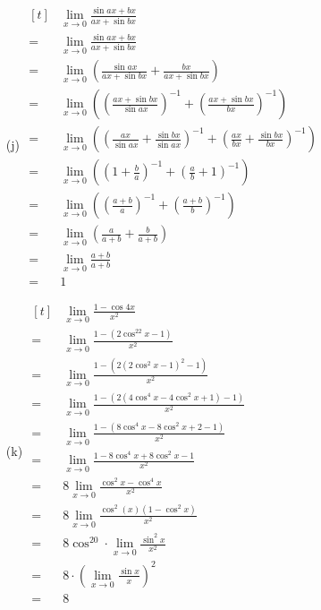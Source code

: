 \documentclass{article}
\begin{document}
\begin{multicols}{2}
\begin{itemize}
\item[(j)] 
$\begin{aligned}[t]
	&\lim\limits_{x\to0}\frac{\sin ax+bx}{ax+\sin bx} \\
	=&\lim\limits_{x\to0}\frac{\sin ax+bx}{ax+\sin bx} \\
	=&\lim\limits_{x\to0}\left(\frac{\sin ax}{ax+\sin bx}+\frac{bx}{ax+\sin bx}\right) \\
	=&\lim\limits_{x\to0}\left(\left(\frac{ax+\sin bx}{\sin ax}\right)^{-1}+
			\left(\frac{ax+\sin bx}{bx}\right)^{-1}\right)\\
	=&\lim\limits_{x\to0}\left(\left(\frac{ax}{\sin ax}+\frac{\sin bx}{\sin ax}\right)^{-1}+
			\left(\frac{ax}{bx}+\frac{\sin bx}{bx}\right)^{-1}\right)\\
			=&\lim\limits_{x\to0}\left(\left(1+\frac{b}{a}\right)^{-1}+\left(\frac{a}{b}+1\right)^{-1}\right)\\
			=&\lim\limits_{x\to0}\left(\left(\frac{a+b}{a}\right)^{-1}+\left(\frac{a+b}{b}\right)^{-1}\right)\\
			=&\lim\limits_{x\to0}\left(\frac{a}{a+b}+\frac{b}{a+b}\right) \\
			=&\lim\limits_{x\to0}\frac{a+b}{a+b} \\
			=&\boxed{1}
\end{aligned}$

\item[(k)] 
$\begin{aligned}[t]
	&\lim\limits_{x\to0}\frac{1-\cos4x}{x^2} \\
	=&\lim\limits_{x\to0}\frac{1-\left(2\cos^22x-1\right)}{x^2} \\
	=&\lim\limits_{x\to0}\frac{1-\left(2\left(2\cos^2x-1\right)^2-1\right)}{x^2} \\
	=&\lim\limits_{x\to0}\frac{1-\left(2\left(4\cos^4x-4\cos^2x+1\right)-1\right)}{x^2} \\
	=&\lim\limits_{x\to0}\frac{1-\left(8\cos^4x-8\cos^2x+2-1\right)}{x^2} \\
	=&\lim\limits_{x\to0}\frac{1-8\cos^4x+8\cos^2x-1}{x^2} \\
	=&8\lim\limits_{x\to0}\frac{\cos^2x-\cos^4x}{x^2} \\
	=&8\lim\limits_{x\to0}\frac{\cos^2\left(x\right)\left(1-\cos^2x\right)}{x^2} \\
	=&8\cos^20\cdot\lim\limits_{x\to0}\frac{\sin^2x}{x^2} \\
	=&8\cdot\left(\lim\limits_{x\to0}\frac{\sin x}{x}\right)^2 \\
	=&\boxed{8}
\end{aligned}$


\end{itemize}
\end{multicols}
\end{document}
